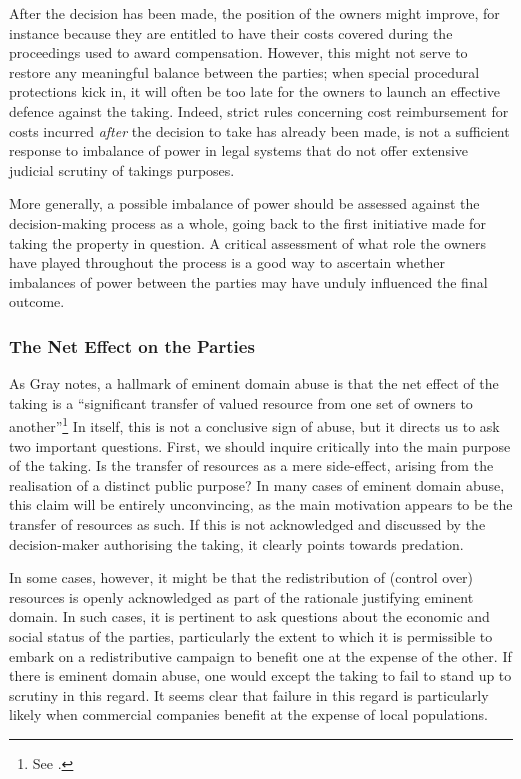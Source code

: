 After the decision has been made, the position of the owners might improve, for instance because they are entitled to have their costs covered during the proceedings used to award compensation. However, this might not serve to restore any meaningful balance between the parties; when special procedural protections kick in, it will often be too late for the owners to launch an effective defence against the taking. Indeed, strict rules concerning cost reimbursement for costs incurred {\it after} the decision to take has already been made, is not a sufficient response to imbalance of power in legal systems that do not offer extensive judicial scrutiny of takings purposes.

More generally, a possible imbalance of power should be assessed against the decision-making process as a whole, going back to the first initiative made for taking the property in question. A critical assessment of what role the owners have played throughout the process is a good way to ascertain whether imbalances of power between the parties may have unduly influenced the final outcome.

\subsubsection*{The Net Effect on the Parties}

As Gray notes, a hallmark of eminent domain abuse is that the net effect of the taking is a ``significant transfer of valued resource from one set of owners to another''\footnote{See \cite[31]{gray11}.} In itself, this is not a conclusive sign of abuse, but it directs us to ask two important questions. First, we should inquire critically into the main purpose of the taking. Is the transfer of resources as a mere side-effect, arising from the realisation of a distinct public purpose? In many cases of eminent domain abuse, this claim will be entirely unconvincing, as the main motivation appears to be the transfer of resources as such. If this is not acknowledged and discussed by the decision-maker authorising the taking, it clearly points towards predation.

In some cases, however, it might be that the redistribution of (control over) resources is openly acknowledged as part of the rationale justifying eminent domain. In such cases, it is pertinent to ask questions about the economic and social status of the parties, particularly the extent to which it is permissible to embark on a redistributive campaign to benefit one at the expense of the other. If there is eminent domain abuse, one would except the taking to fail to stand up to scrutiny in this regard. It seems clear that failure in this regard is particularly likely when commercial companies benefit at the expense of local populations.

